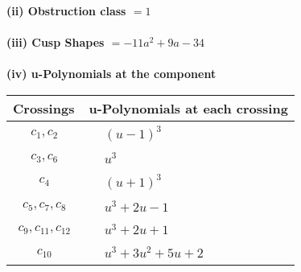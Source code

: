 \documentclass[1p]{elsarticle_modified}
\theoremstyle{definition}
\begin{document}
\flushleft \textbf{(ii) Obstruction class $= 1$}\\~\\
\flushleft \textbf{(iii) Cusp Shapes $= -11 a^2+9 a-34$}\\~\\
\newpage\renewcommand{\arraystretch}{1}
\flushleft \textbf{(iv) u-Polynomials at the component}\newline \\
\begin{tabular}{m{50pt}|m{274pt}}
Crossings & \hspace{64pt}u-Polynomials at each crossing \\
\hline $$\begin{aligned}c_{1},c_{2}\end{aligned}$$&$\begin{aligned}
&(u-1)^3
\end{aligned}$\\
\hline $$\begin{aligned}c_{3},c_{6}\end{aligned}$$&$\begin{aligned}
&u^3
\end{aligned}$\\
\hline $$\begin{aligned}c_{4}\end{aligned}$$&$\begin{aligned}
&(u+1)^3
\end{aligned}$\\
\hline $$\begin{aligned}c_{5},c_{7},c_{8}\end{aligned}$$&$\begin{aligned}
&u^3+2 u-1
\end{aligned}$\\
\hline $$\begin{aligned}c_{9},c_{11},c_{12}\end{aligned}$$&$\begin{aligned}
&u^3+2 u+1
\end{aligned}$\\
\hline $$\begin{aligned}c_{10}\end{aligned}$$&$\begin{aligned}
&u^3+3 u^2+5 u+2
\end{aligned}$\\
\hline
\end{tabular}\\~\\
\newpage\renewcommand{\arraystretch}{1}
\end{document}
